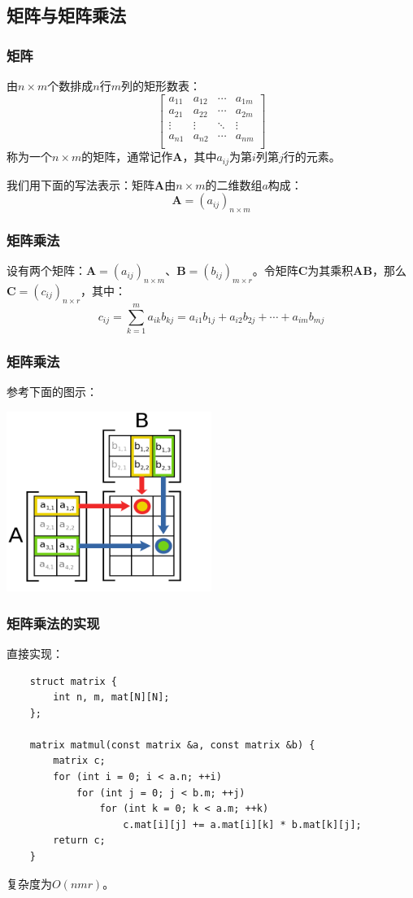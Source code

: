 \documentclass[9pt,dvipsnames]{beamer}
\begin{document}
\subsection{矩阵与矩阵乘法}
\begin{frame}
	\frametitle{矩阵}
	由$n\times m$个数排成$n$行$m$列的矩形数表：
	\[ \left[\begin{matrix}
		a_{11} & a_{12} & \cdots & a_{1m} \\
		a_{21} & a_{22} & \cdots & a_{2m} \\
		\vdots & \vdots & \ddots & \vdots \\
		a_{n1} & a_{n2} & \cdots & a_{nm} \\
	\end{matrix}\right] \]
	称为一个$n\times m$的矩阵，通常记作$\mathbf{A}$，其中$a_{ij}$为第$i$列第$j$行的元素。

	我们用下面的写法表示：矩阵$\mathbf{A}$由$n\times m$的二维数组$a$构成：
	\[ \mathbf{A}=(a_{ij})_{n\times m} \]
\end{frame}
\begin{frame}
	\frametitle{矩阵乘法}
	设有两个矩阵：$\mathbf{A}=(a_{ij})_{n\times m}$、$\mathbf{B}=(b_{ij})_{m\times r}$。令矩阵$\mathbf{C}$为其乘积$\mathbf{AB}$，那么$\mathbf{C}=(c_{ij})_{n\times r}$，其中：
	\[ c_{ij} = \sum_{k=1}^{m} a_{ik}b_{kj} = a_{i1}b_{1j}+a_{i2}b_{2j}+\cdots+a_{im}b_{mj} \]
\end{frame}
\begin{frame}
	\frametitle{矩阵乘法}
	参考下面的图示：
	\begin{center}
		\includegraphics[width=0.5\textwidth]{images/matmul.png}
	\end{center}
\end{frame}
\begin{frame}[fragile]
	\frametitle{矩阵乘法的实现}
	直接实现：
	\begin{verbatim}
	struct matrix {
		int n, m, mat[N][N];
	};
	
	matrix matmul(const matrix &a, const matrix &b) {
		matrix c;
		for (int i = 0; i < a.n; ++i)
			for (int j = 0; j < b.m; ++j)
				for (int k = 0; k < a.m; ++k)
					c.mat[i][j] += a.mat[i][k] * b.mat[k][j];
		return c;
	}
	\end{verbatim}
	复杂度为$O(nmr)$。
\end{frame}
\end{document}

